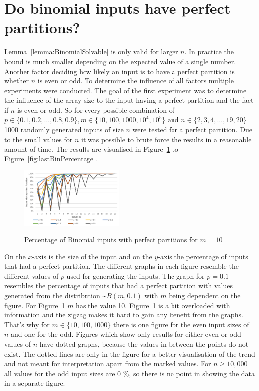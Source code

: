 \section{Do binomial inputs have perfect partitions?}\label{Sec:BinomialSolvable}

Lemma~\ref{lemma:BinomialSolvable} is only valid for larger $n$.
In practice the bound is much smaller depending on the expected value of a single number.
Another factor deciding how likely an input is to have a perfect partition is whether $n$ is even or odd.
To determine the influence of all factors multiple experiments were conducted.
The goal of the first experiment was to determine the influence of the array size to the input having a perfect partition and the fact if $n$ is even or odd.
So for every possible combination of $p \in \{0.1, 0.2, \dots , 0.8, 0.9\}, m \in \{10,100,1000,10^4,10^5\} \text{ and } n \in \{2,3,4,\dots,19,20\}$ 1000 randomly generated inputs of size $n$ were tested for a perfect partition.
Due to the small values for $n$ it was possible to brute force the results in a reasonable amount of time.
The results are visualised in Figure~\ref{fig:firstBinPercentage} to Figure~\ref{fig:lastBinPercentage}.

\begin{figure}[h]
      \caption{Percentage of Binomial inputs with perfect partitions for $m = 10$}
      \centering
      \includegraphics[width=0.45\textwidth]{figures/images/solvabilityOfInputs/binomial_Input_Solvable_m10.png}\label{fig:firstBinPercentage}
\end{figure}

On the $x$-axis is the size of the input and on the $y$-axis the percentage of inputs that had a perfect partition.
The different graphs in each figure resemble the different values of $p$ used for generating the inputs.
The graph for $p=0.1$ resembles the percentage of inputs that had a perfect partition with values generated from the distribution \textasciitilde$B(m,0.1)$ with $m$ being dependent on the figure.
For Figure~\ref{fig:firstBinPercentage} $m$ has the value 10.\newline
Figure~\ref{fig:firstBinPercentage} is a bit overloaded with information and the zigzag makes it hard to gain any benefit from the graphs.
That's why for $m \in \{10,100,1000\}$ there is one figure for the even input sizes of $n$ and one for the odd.
Figures which show only results for either even or odd values of $n$ have dotted graphs, because the values in between the points do not exist.
The dotted lines are only in the figure for a better visualisation of the trend and not meant for interpretation apart from the marked values.
For $n\ge10,000$ all values for the odd input sizes are 0 \%, so there is no point in showing the data in a separate figure.

